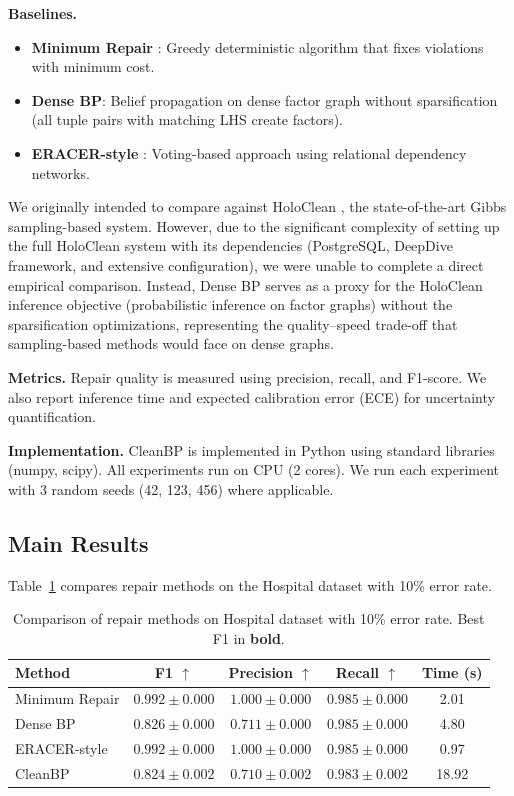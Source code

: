 \documentclass{article}
\begin{document}
\textbf{Baselines.}
\begin{itemize}
    \item \textbf{Minimum Repair} \citep{kolahi2009approximating}: Greedy deterministic algorithm that fixes violations with minimum cost.
    \item \textbf{Dense BP}: Belief propagation on dense factor graph without sparsification (all tuple pairs with matching LHS create factors).
    \item \textbf{ERACER-style} \citep{mayfield2010eracer}: Voting-based approach using relational dependency networks.
\end{itemize}

We originally intended to compare against HoloClean \citep{rekatsinas2017holoclean}, the state-of-the-art Gibbs sampling-based system. However, due to the significant complexity of setting up the full HoloClean system with its dependencies (PostgreSQL, DeepDive framework, and extensive configuration), we were unable to complete a direct empirical comparison. Instead, Dense BP serves as a proxy for the HoloClean inference objective (probabilistic inference on factor graphs) without the sparsification optimizations, representing the quality--speed trade-off that sampling-based methods would face on dense graphs.

\textbf{Metrics.} Repair quality is measured using precision, recall, and F1-score. We also report inference time and expected calibration error (ECE) for uncertainty quantification.

\textbf{Implementation.} CleanBP is implemented in Python using standard libraries (numpy, scipy). All experiments run on CPU (2 cores). We run each experiment with 3 random seeds (42, 123, 456) where applicable.

\subsection{Main Results}

Table~\ref{tab:main_results} compares repair methods on the Hospital dataset with 10\% error rate.

\begin{table}[t]
\centering
\caption{Comparison of repair methods on Hospital dataset with 10\% error rate. Best F1 in \textbf{bold}.}
\label{tab:main_results}
\begin{tabular}{lcccc}
\toprule
Method & F1 $\uparrow$ & Precision $\uparrow$ & Recall $\uparrow$ & Time (s) \\
\midrule
Minimum Repair & $\mathbf{0.992} \pm 0.000$ & $\mathbf{1.000} \pm 0.000$ & $0.985 \pm 0.000$ & 2.01 \\
Dense BP & $0.826 \pm 0.000$ & $0.711 \pm 0.000$ & $0.985 \pm 0.000$ & 4.80 \\
ERACER-style & $\mathbf{0.992} \pm 0.000$ & $\mathbf{1.000} \pm 0.000$ & $0.985 \pm 0.000$ & 0.97 \\
CleanBP & $0.824 \pm 0.002$ & $0.710 \pm 0.002$ & $0.983 \pm 0.002$ & 18.92 \\
\bottomrule
\end{tabular}
\end{table}
\end{document}
